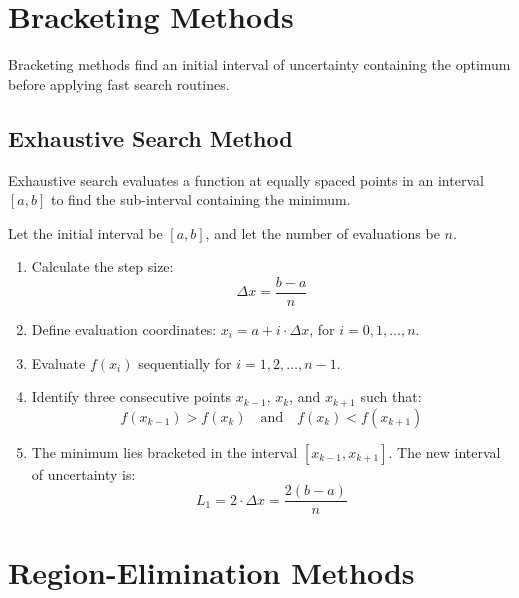 \documentclass[12pt,a4paper]{article}
\begin{document}
\section{Bracketing Methods}

Bracketing methods find an initial interval of uncertainty containing the optimum before applying fast search routines.

\subsection{Exhaustive Search Method}
Exhaustive search evaluates a function at equally spaced points in an interval $[a, b]$ to find the sub-interval containing the minimum.

\begin{tcolorbox}[formulabox, title={Exhaustive Search Algorithm}]
Let the initial interval be $[a, b]$, and let the number of evaluations be $n$.
\begin{enumerate}[label=\textbf{\arabic*.}, leftmargin=*, itemsep=2pt, topsep=0pt]
  \item Calculate the step size:
    \begin{equation}
      \Delta x = \frac{b - a}{n}
    \end{equation}
  \item Define evaluation coordinates: $x_i = a + i \cdot \Delta x$, for $i = 0, 1, \dots, n$.
  \item Evaluate $f(x_i)$ sequentially for $i = 1, 2, \dots, n-1$.
  \item Identify three consecutive points $x_{k-1}$, $x_k$, and $x_{k+1}$ such that:
    \begin{equation}
      f(x_{k-1}) > f(x_k) \quad \text{and} \quad f(x_k) < f(x_{k+1})
    \end{equation}
  \item The minimum lies bracketed in the interval $[x_{k-1}, x_{k+1}]$. The new interval of uncertainty is:
    \begin{equation}
      L_1 = 2 \cdot \Delta x = \frac{2(b - a)}{n}
    \end{equation}
\end{enumerate}
\end{tcolorbox}

\section{Region-Elimination Methods}
\end{document}

